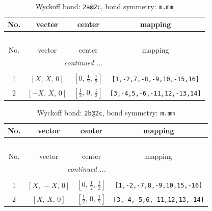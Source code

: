 \documentclass[fleqn,8pt]{jsarticle}
\begin{document}
\begin{longtable}{cccc}
\caption{Wyckoff bond: {\tt 2a@2c}, bond symmetry: {\tt m.mm}}
 \\
 \hline \hline
No. & vector & center & mapping \\ \hline \endfirsthead

\multicolumn{3}{l}{\tablename\ \thetable{}} \\
 \hline \hline
No. & vector & center & mapping \\ \hline \endhead

 \hline \hline
\multicolumn{3}{r}{\footnotesize\it continued ...} \\ \endfoot

 \hline \hline
\multicolumn{3}{r}{} \\ \endlastfoot

1 & $\left[ X,\, X,\, 0 \right]$ & $\left[ 0,\, \frac{1}{2},\, \frac{1}{2} \right]$ & {\tt [1,-2,7,-8,-9,10,-15,16]} \\ \hline
2 & $\left[ - X,\, X,\, 0 \right]$ & $\left[ \frac{1}{2},\, 0,\, \frac{1}{2} \right]$ & {\tt [3,-4,5,-6,-11,12,-13,14]} \\
\end{longtable}
\renewcommand{\arraystretch}{1.2}
\begin{longtable}{cccc}
\caption{Wyckoff bond: {\tt 2b@2c}, bond symmetry: {\tt m.mm}}
 \\
 \hline \hline
No. & vector & center & mapping \\ \hline \endfirsthead

\multicolumn{3}{l}{\tablename\ \thetable{}} \\
 \hline \hline
No. & vector & center & mapping \\ \hline \endhead

 \hline \hline
\multicolumn{3}{r}{\footnotesize\it continued ...} \\ \endfoot

 \hline \hline
\multicolumn{3}{r}{} \\ \endlastfoot

1 & $\left[ X,\, - X,\, 0 \right]$ & $\left[ 0,\, \frac{1}{2},\, \frac{1}{2} \right]$ & {\tt [1,-2,-7,8,-9,10,15,-16]} \\ \hline
2 & $\left[ X,\, X,\, 0 \right]$ & $\left[ \frac{1}{2},\, 0,\, \frac{1}{2} \right]$ & {\tt [3,-4,-5,6,-11,12,13,-14]} \\
\end{longtable}
\renewcommand{\arraystretch}{1.2}
\end{document}

